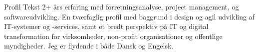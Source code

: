 \documentclass{resume}
\begin{document}

\begin{rSection}{Profil Tekst}
    {2+ års erfaring med forretningsanalyse, project management, og softwareudvikling.}
    {En tværfaglig profil med baggrund i design og agil udvikling af IT-systemer og -services, samt et bredt perspektiv på IT og digital transformation for virksomheder, non-profit organisationer og offentlige myndigheder.}
    {Jeg er flydende i både Dansk og Engelsk.}
\end{rSection}

\end{document}
